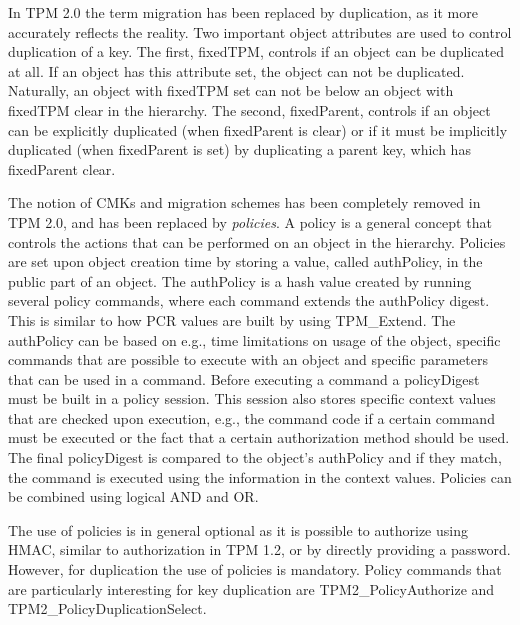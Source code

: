 {In TPM 2.0 the term migration has been replaced by duplication, as it more accurately reflects the reality.
Two important object attributes are used to control duplication of a key. The first, fixedTPM, controls if an object can be duplicated at all. If an object has this attribute set, the object can not be duplicated. Naturally, an object with fixedTPM set can not be below an object with fixedTPM clear in the hierarchy. The second, fixedParent, controls if an object can be explicitly duplicated (when fixedParent is clear) or if it must be implicitly duplicated (when fixedParent is set) by duplicating a parent key, which has fixedParent clear.
 
The notion of CMKs and migration schemes has been completely removed in TPM 2.0, and has been replaced by \textit{policies}. A policy is a general concept that controls the actions that can be performed on an object in the hierarchy. Policies are set upon object creation time by storing a value, called authPolicy, in the public part of an object. The authPolicy is a hash value created by running several policy commands, where each command extends the authPolicy digest. This is similar to how PCR values are built by using TPM\_Extend. The authPolicy can be based on e.g., time limitations on usage of the object, specific commands that are possible to execute with an object and specific parameters that can be used in a command. Before executing a command a policyDigest must be built in a policy session. This session also stores specific context values that are checked upon execution, e.g., the command code if a certain command must be executed or the fact that a certain authorization method should be used. The final policyDigest is compared to the object's authPolicy and if they match, the command is executed using the information in the context values. Policies can be combined using logical AND and OR.
 
The use of policies is in general optional as it is possible to authorize using HMAC, similar to authorization in TPM 1.2, or by directly providing a password. However, for duplication the use of policies is mandatory. Policy commands that are particularly interesting for key duplication are TPM2\_PolicyAuthorize and TPM2\_PolicyDuplicationSelect.
 
}
